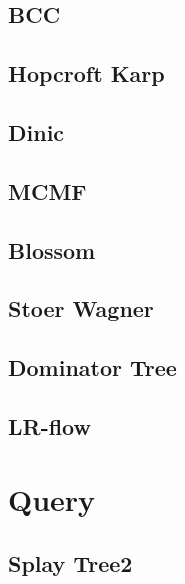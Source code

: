 \documentclass[10pt,landscape,a4paper,twocolumn]{article}
\begin{document}
\subsection{BCC}


\subsection{Hopcroft Karp}


\subsection{Dinic}


\subsection{MCMF}


\subsection{Blossom}


\subsection{Stoer Wagner}


\subsection{Dominator Tree}


\subsection{LR-flow}


%
\section{Query}

\subsection{Splay Tree2}

\end{document}
